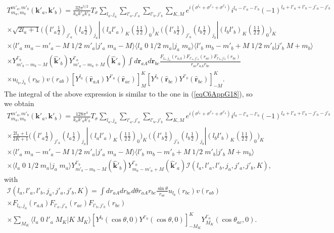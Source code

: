 \begin{multline}\label{eqC6AppG42}
T_{m_a,m_b}^{m'_a,m'_b}(\mathbf{k}'_a,\mathbf{k}'_b)=\frac{32\pi^{5/2}}{k_ak'_ak'_b}T_\sigma\sum_{l_a,j_a}\sum_{l'_a,j'_a}\sum_{l'_b,j'_b}\sum_{K,M}
 e^{i(\sigma^{l_a}+\sigma^{l'_a}+\sigma^{l'_b})}i^{l_a-l'_a-l'_b}(-1)^{l_a+l'_a+l'_b-j'_a-j'_b}\\
 \times \sqrt{2l_a+1}\bigl((l'_a \tfrac{1}{2})_{j'_a}(l_a \tfrac{1}{2})_{j_a}|(l_a l'_a)_K(\tfrac{1}{2} \tfrac{1}{2})_0\bigr)_K\,\bigl((l'_b \tfrac{1}{2})_{j'_b}(l_b \tfrac{1}{2})_{j_b}|(l_b l'_b)_{K}(\tfrac{1}{2} \tfrac{1}{2})_0\bigr)_{K}\\
\times \langle l'_a\;m_a-m'_a-M\;1/2\;m'_a|j'_a\;m_a-M\rangle \langle l_a\;0\;1/2\;m_a|j_a\;m_a\rangle\langle l'_b\;m_b-m'_b+M\;1/2\;m'_b|j'_b\;M+m_b\rangle\\
\times Y^{l'_b}_{m'_b-m_b-M} (\hat {\mathbf{k}}'_b)Y^{l'_a}_{m'_a-m_a+M} (\hat {\mathbf{k}}'_a)
\int d\mathbf{r}_{aA}d \mathbf{r}_{bc}\frac{F_{l_a,j_a}(r_{aA})  F_{l'_a,j'_a}(r_{ac})F_{l'_b,j'_b}(r_{bc})}{r_{ac}r_{aA}r_{bc}}\\
\times u_{l_b,j_b}(r_{bc})v(r_{ab})\left[ Y^{l_a} (\hat{\mathbf r}_{aA}) Y^{l'_a} (\hat{ \mathbf r}_{ac})\right]^K_M   \left[ Y^{l_b} (\hat{\mathbf r}_{bc}) Y^{l'_b} (\hat{\mathbf r}_{bc})\right]^{K}_{-M}.
\end{multline}
The integral of the above expression is similar to the one in (\ref{eqC6AppG18}), so we obtain
\begin{multline}\label{eqC6AppG43}
T_{m_a,m_b}^{m'_a,m'_b}(\mathbf{k}'_a,\mathbf{k}'_b)=\frac{128\pi^{4}}{k_ak'_ak'_b}T_\sigma\sum_{l_a,j_a}\sum_{l'_a,j'_a}\sum_{l'_b,j'_b}\sum_{K,M}
 e^{i(\sigma^{l_a}+\sigma^{l'_a}+\sigma^{l'_b})}i^{l_a-l'_a-l'_b}(-1)^{l_a+l'_a+l'_b-j'_a-j'_b}\\
 \times \frac{2l_a+1}{2K+1}\bigl((l'_a \tfrac{1}{2})_{j'_a}(l_a \tfrac{1}{2})_{j_a}|(l_a l'_a)_K(\tfrac{1}{2} \tfrac{1}{2})_0\bigr)_K\,\bigl((l'_b \tfrac{1}{2})_{j'_b}(l_b \tfrac{1}{2})_{j_b}|(l_b l'_b)_{K}(\tfrac{1}{2} \tfrac{1}{2})_0\bigr)_{K}\\
\times \langle l'_a\;m_a-m'_a-M\;1/2\;m'_a|j'_a\;m_a-M\rangle \langle l'_b\;m_b-m'_b+M\;1/2\;m'_b|j'_b\;M+m_b\rangle\\
\times \langle l_a\;0\;1/2\;m_a|j_a\;m_a\rangle Y^{l'_b}_{m'_b-m_b-M} (\hat {\mathbf{k}}'_b)Y^{l'_a}_{m_a-m'_a+M} (\hat {\mathbf{k}}'_a)
\mathcal I(l_a,l'_a,l'_b,j_a,j'_a,j'_b,K),
\end{multline}
with
\begin{multline}\label{eqC6AppG44}
\mathcal I(l_a,l'_a,l'_b,j_a,j'_a,j'_b,K)=\int dr_{aA} dr_{bc}d\theta r_{aA}r_{bc} \frac{\sin \theta}{r_{ac}} u_{l_b}(r_{bc})v(r_{ab})\\
\times F_{l_a,j_a}(r_{aA})  F_{l'_a,j'_a}(r_{ac})F_{l'_b,j'_b}(r_{bc}) \\
\times \sum_{M_K} \langle l_a\;0\;l'_a\;M_K|K\;M_K\rangle \left[ Y^{l_b} (\cos \theta,0) Y^{l'_b} (\cos \theta,0)\right]^{K}_{-M_K} Y^{l'_a}_{M_K} (\cos \theta_{ac},0).
\end{multline}
